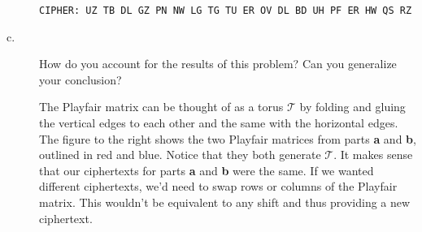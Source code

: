 \documentclass[../hw_sols.tex]{subfiles}
\begin{document}
\begin{description}
\begin{solution}
\begin{Verbatim}
CIPHER: UZ TB DL GZ PN NW LG TG TU ER OV DL BD UH PF ER HW QS RZ
\end{Verbatim}

\end{solution}

\item[c.] How do you account for the results of this problem? Can you 
generalize your conclusion?

\begin{solution}
\newline  %
\begin{minipage}{0.55\linewidth}
The Playfair matrix can be thought of as a torus $\mathcal{T}$ by folding 
and gluing the vertical edges to each other and the same with the horizontal 
edges. The figure to the right shows the two Playfair matrices from parts 
\textbf{a} and \textbf{b}, outlined in red and blue. Notice that they both 
generate $\mathcal{T}$. It makes sense that our ciphertexts for parts 
\textbf{a} and \textbf{b} were the same. If we wanted different ciphertexts, 
we'd need to swap rows or columns of the Playfair matrix. This wouldn't be 
equivalent to any shift and thus providing a new ciphertext.
\end{minipage}
\quad
\begin{minipage}{0.4\linewidth}
\end{minipage}

\end{solution}

\end{description}
\end{document}
